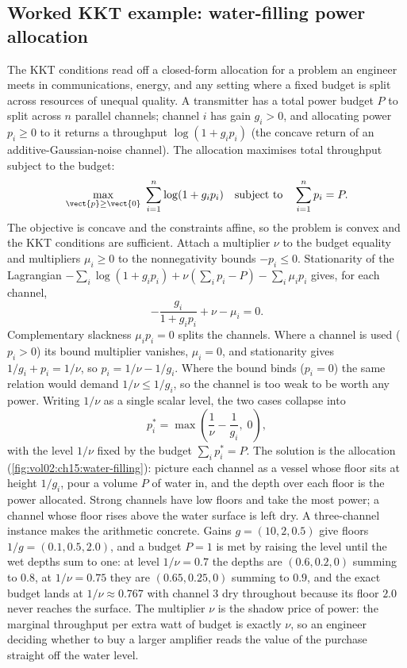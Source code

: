 \subsection{Worked KKT example: water-filling power allocation}

The KKT conditions read off a closed-form allocation for a problem an
engineer meets in communications, energy, and any setting where a fixed
budget is split across resources of unequal quality. A transmitter has a
total power budget $P$ to split across $n$ parallel channels; channel
$i$ has gain $g_{i} > 0$, and allocating power $p_{i} \geq 0$ to it
returns a throughput $\log(1 + g_{i} p_{i})$ (the concave return of an
additive-Gaussian-noise channel). The allocation maximises total
throughput subject to the budget:
\[
\max_{\vect{p} \geq \vect{0}} \; \sum_{i=1}^{n} \log(1 + g_{i} p_{i})
\quad \text{subject to} \quad \sum_{i=1}^{n} p_{i} = P.
\]
The objective is concave and the constraints affine, so the problem is
convex and the KKT conditions are sufficient. Attach a multiplier $\nu$
to the budget equality and multipliers $\mu_{i} \geq 0$ to the
nonnegativity bounds $-p_{i} \leq 0$. Stationarity of the Lagrangian
$-\sum_{i} \log(1 + g_{i} p_{i}) + \nu(\sum_{i} p_{i} - P) - \sum_{i}
\mu_{i} p_{i}$ gives, for each channel,
\[
-\frac{g_{i}}{1 + g_{i} p_{i}} + \nu - \mu_{i} = 0.
\]
Complementary slackness $\mu_{i} p_{i} = 0$ splits the channels. Where a
channel is used ($p_{i} > 0$) its bound multiplier vanishes, $\mu_{i} =
0$, and stationarity gives $1/g_{i} + p_{i} = 1/\nu$, so $p_{i} = 1/\nu
- 1/g_{i}$. Where the bound binds ($p_{i} = 0$) the same relation would
demand $1/\nu \leq 1/g_{i}$, so the channel is too weak to be worth any
power. Writing $1/\nu$ as a single scalar level, the two cases collapse
into
\[
p_{i}^{*} = \max\!\left(\frac{1}{\nu} - \frac{1}{g_{i}}, \; 0\right),
\]
with the level $1/\nu$ fixed by the budget $\sum_{i} p_{i}^{*} = P$. The
solution is the  allocation
(\cref{fig:vol02:ch15:water-filling}): picture each channel as a vessel
whose floor sits at height $1/g_{i}$, pour a volume $P$ of water in, and
the depth over each floor is the power allocated. Strong channels have
low floors and take the most power; a channel whose floor rises above
the water surface is left dry. A three-channel instance makes the
arithmetic concrete. Gains $g = (10, 2, 0.5)$ give floors $1/g = (0.1,
0.5, 2.0)$, and a budget $P = 1$ is met by raising the level until the
wet depths sum to one: at level $1/\nu = 0.7$ the depths are $(0.6, 0.2,
0)$ summing to $0.8$, at $1/\nu = 0.75$ they are $(0.65, 0.25, 0)$
summing to $0.9$, and the exact budget lands at $1/\nu \approx 0.767$
with channel 3 dry throughout because its floor $2.0$ never reaches the
surface. The multiplier $\nu$ is the shadow price of power: the marginal
throughput per extra watt of budget is exactly $\nu$, so an engineer
deciding whether to buy a larger amplifier reads the value of the
purchase straight off the water level.

